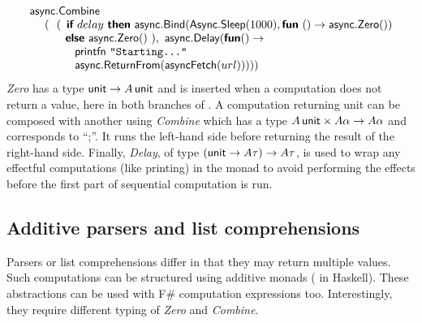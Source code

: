 \documentclass[runningheads,a4paper]{llncs}
\begin{document}
\begin{equation*}
\begin{array}{l}
\textnormal{\sffamily async}.\textnormal{\sffamily Combine} \\
\quad~(~~ (~\,\textnormal{\bfseries\sffamily if}~delay~\textnormal{\bfseries\sffamily then}~
   \textnormal{\sffamily async}.\textnormal{\sffamily Bind}(\textnormal{\sffamily Async}.\textnormal{\sffamily Sleep}(1000), \textnormal{\bfseries\sffamily fun}~() \rightarrow \textnormal{\sffamily async}.\textnormal{\sffamily Zero}())\\
\quad\quad ~~~\,\textnormal{\bfseries\sffamily else}~\textnormal{\sffamily async}.\textnormal{\sffamily Zero}()~),~ \textnormal{\sffamily async}.\textnormal{\sffamily Delay}(\textnormal{\bfseries\sffamily fun} () \rightarrow\\
\quad\quad\quad\quad \textnormal{\sffamily printfn}~\texttt{"Starting..."}\\
\quad\quad\quad\quad \textnormal{\sffamily async}.\textnormal{\sffamily ReturnFrom}(\textnormal{\sffamily asyncFetch}(url))) ))
\end{array}
\end{equation*}
%
\emph{Zero} has a type $\textnormal{\sffamily unit} \rightarrow A\,\textnormal{\sffamily unit}$ and is inserted
when a computation does not return a value, here in both branches of . 
A computation returning unit can be composed with another using \emph{Combine} which
has a type $A\,\textnormal{\sffamily unit} \times A\alpha \rightarrow A\alpha$ and corresponds to
``;''. It runs the left-hand side before returning the result of the right-hand side.
Finally, \emph{Delay}, of type $(\textnormal{\sffamily unit} \rightarrow A\tau) \rightarrow A\tau$, is
used to wrap any effectful computations (like printing) in the monad to avoid performing
the effects before the first part of sequential computation is run.


\subsection{Additive parsers and list comprehensions}
\label{sec:intro-seq-parsers}

Parsers \cite{monad-parsing} or list comprehensions differ in that they may return multiple values.
Such computations can be structured using additive monads ( in 
Haskell). These abstractions can be used with F\# computation expressions too. Interestingly, they 
require different typing of \emph{Zero} and \emph{Combine}. 

\vspace{-1em}
\end{document}
